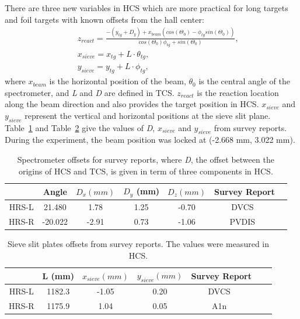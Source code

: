 There are three new variables in HCS which are more practical for long targets and foil targets with known offsets from the hall center:
\begin{eqnarray}
  & & z_{react} = \frac{-\left(y_{tg} + D_{y}\right)+x_{beam}\left(cos\left(\Theta_{0}\right)-\phi_{tg} sin\left(\Theta_{0}\right)\right)}{cos(\Theta_{0})\phi_{tg}+sin(\Theta_{0})}, \\
  & & x_{sieve} = x_{tg} + L\cdot \theta_{tg},\\
  & & y_{sieve} = y_{tg} + L\cdot \phi_{tg},
\end{eqnarray}
where $x_{beam}$ is the horizontal position of the beam, $\theta_{0}$ is the central angle of the spectrometer, and \emph{L} and \emph{D} are defined in TCS. $z_{react}$ is the reaction location along the beam direction and also provides the target position in HCS. $x_{sieve}$ and $y_{sieve}$ represent the vertical and horizontal positions at the sieve slit plane. Table~\ref{optics_offset_table} and Table~\ref{sieve_offset_table} give the values of \emph{D}, $x_{sieve}$ and $y_{sieve}$ from survey reports. During the experiment, the beam position was locked at (-2.668 mm, 3.022 mm).

\begin{table}
  \centering 
  \begin{tabular}{|c||c|c|c|c|c|c|}
    \hline
    &   Angle   &    $D_{x} (mm)$ & $D_{y}$ (mm) & $D_{z} (mm)$ & Survey Report \\
    \hline \hline
    HRS-L & 21.480   & 1.78 & 1.25 & -0.70  & DVCS~\cite{survey_dvcs_2010}\\
    \hline 
    HRS-R & -20.022 & -2.91 & 0.73 & -1.06 & PVDIS~\cite{survey_pvdis_2009}\\
    \hline 
  \end{tabular}
  \caption[Spectrometer offsets from survey reports]{\footnotesize{ Spectrometer offsets for survey reports, where \emph{D}, the offset between the origins of HCS and TCS, is given in term of three components in HCS.}}
  \label{optics_offset_table}
\end{table}

\begin{table}
  \centering
  \begin{tabular}{|c||c|c|c|c|c|c|}
    \hline
    &   L  (mm) &    $x_{sieve} (mm)$ &  $y_{sieve} (mm)$  &  Survey Report\\
    \hline \hline
    HRS-L & 1182.3  & -1.05 & 0.20  & DVCS~\cite{survey_dvcs_2010}\\
    \hline 
    HRS-R & 1175.9  & 1.04  & 0.05 & A1n~\cite{survey_a1n_2009} \\
    \hline 
  \end{tabular}
  \caption[Sieve slit plates offsets from survey reports.]{\footnotesize{ Sieve slit plates offsets from survey reports. The values were measured in HCS.}}
  \label{sieve_offset_table}
\end{table}

